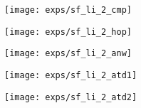\documentclass{USC-Thesis}
\numberwithin{equation}{chapter}
\begin{document}
\begin{figure*}[!ht]
	\begin{minipage}[b]{0.195\linewidth}
		\centering
		\texttt{[image: exps/sf\_li\_2\_cmp]}
		\label{fig:sf_li_2_cell}
	\end{minipage}
	\begin{minipage}[b]{0.195\linewidth}
	\centering
		\texttt{[image: exps/sf\_li\_2\_hop]}
		\label{fig:sf_li_2_hop}
	\end{minipage}
	\begin{minipage}[b]{0.195\linewidth}
	\centering
		\texttt{[image: exps/sf\_li\_2\_anw]}
		\label{fig:sf_li_2_anw}
	\end{minipage}
	\begin{minipage}[b]{0.195\linewidth}
	\centering
		\texttt{[image: exps/sf\_li\_2\_atd1]}
		\label{fig:sf_li_2_atd1}
	\end{minipage}	
	\begin{minipage}[b]{0.195\linewidth}
	\centering
		\texttt{[image: exps/sf\_li\_2\_atd2]}
		\label{fig:sf_li_2_atd2}
	\end{minipage}



\end{figure*}
\end{document}
